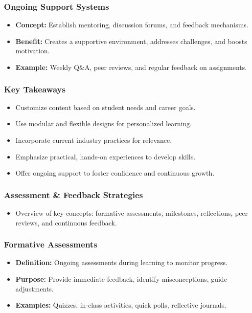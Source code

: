 \documentclass{beamer}
\begin{document}
\begin{frame}[fragile]
  \frametitle{Ongoing Support Systems}
  \begin{itemize}
    \item \textbf{Concept:} Establish mentoring, discussion forums, and feedback mechanisms.
    \item \textbf{Benefit:} Creates a supportive environment, addresses challenges, and boosts motivation.
    \item \textbf{Example:} Weekly Q\&A, peer reviews, and regular feedback on assignments.
  \end{itemize}
\end{frame}

\begin{frame}[fragile]
  \frametitle{Key Takeaways}
  \begin{itemize}
    \item Customize content based on student needs and career goals.
    \item Use modular and flexible designs for personalized learning.
    \item Incorporate current industry practices for relevance.
    \item Emphasize practical, hands-on experiences to develop skills.
    \item Offer ongoing support to foster confidence and continuous growth.
  \end{itemize}
\end{frame}

\begin{frame}[fragile]
\frametitle{Assessment \& Feedback Strategies}
\begin{itemize}
  \item Overview of key concepts: formative assessments, milestones, reflections, peer reviews, and continuous feedback.
\end{itemize}
\end{frame}

\begin{frame}[fragile]
\frametitle{Formative Assessments}
\begin{itemize}
  \item \textbf{Definition:} Ongoing assessments during learning to monitor progress.
  \item \textbf{Purpose:} Provide immediate feedback, identify misconceptions, guide adjustments.
  \item \textbf{Examples:} Quizzes, in-class activities, quick polls, reflective journals.
\end{itemize}
\end{frame}
\end{document}
